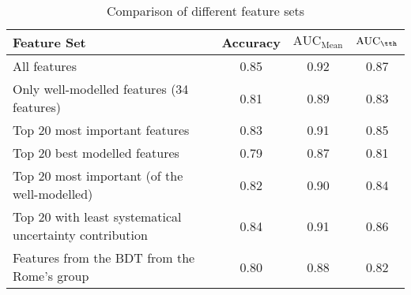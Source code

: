 \begin{table}[htbp]
    \centering
    \begin{tabular}{lccc}
        \toprule
        Feature Set                                             & Accuracy & $\text{AUC}_\text{Mean}$ & $\text{AUC}_\tth$ \\
        \midrule
        All features                                            & 0.85     & 0.92                     & 0.87              \\
        Only well-modelled features      (34 features)          & 0.81     & 0.89                     & 0.83              \\
        Top 20 most important features                          & 0.83     & 0.91                     & 0.85              \\
        Top 20 best modelled features                           & 0.79     & 0.87                     & 0.81              \\
        Top 20 most important (of the well-modelled)            & 0.82     & 0.90                     & 0.84              \\
        Top 20 with least systematical uncertainty contribution & 0.84     & 0.91                     & 0.86              \\
        Features from the BDT from the Rome's group             & 0.80     & 0.88                     & 0.82              \\
        \bottomrule
    \end{tabular}
    \caption{Comparison of different feature sets}
    \label{tab:feature_sets}
\end{table}